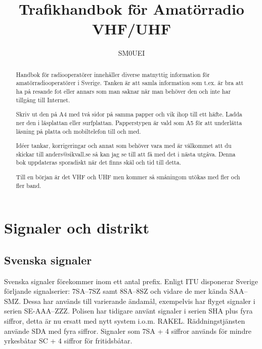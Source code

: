 \documentclass[10pt,swedish,a4paper,twoside]{article}
\begin{document}
\title{Trafikhandbok för Amatörradio\\
VHF/UHF}
\author{SM0UEI}
\maketitle

\begin{abstract}
Handbok för radiooperatörer innehåller diverse matnyttig information för amatörradiooperatörer i Sverige. Tanken är att samla information som t.ex. är bra att ha på resande fot eller annars som man saknar när man behöver den och inte har tillgång till Internet.

Skriv ut den på A4 med två sidor på samma papper och vik ihop till ett häfte. Ladda ner den i läsplattan eller surfplattan. Papperstypen är vald som A5 för att underlätta läsning på platta och mobiltelefon till och med.

Idéer tankar, korrigeringar och annat som behöver vara med är väl\-kom\-met att du skickar till anders@sikvall.se så kan jag se till att få med det i nästa utgåva. Denna bok uppdateras sporadiskt när det finns skäl och tid till detta.

Till en början är det VHF och UHF men kommer så småningom utökas med fler och fler band.
\end{abstract}

\clearpage
\tableofcontents
\clearpage

\setlength{\parskip}{0.5em}
\setlength{\parindent}{0pt}


\section{Signaler och distrikt}

\subsection{Svenska signaler}

Svenska signaler förekommer inom ett antal prefix. Enligt ITU disponerar Sverige förljande signalserier:
7SA--7SZ samt 8SA--8SZ och vidare de mer kända SAA--SMZ. Dessa har används till varierande ändamål, exempelvis har flyget signaler i serien SE-AAA--ZZZ. Polisen har tidigare använt signaler i serien SHA plus fyra siffror, detta är nu ersatt med nytt system i.o.m. RAKEL. Räddningstjänsten använde SDA med fyra siffror. Signaler som 7SA + 4 siffror används för mindre yrkesbåtar SC + 4 siffror för fritidsbåtar.
\end{document}
